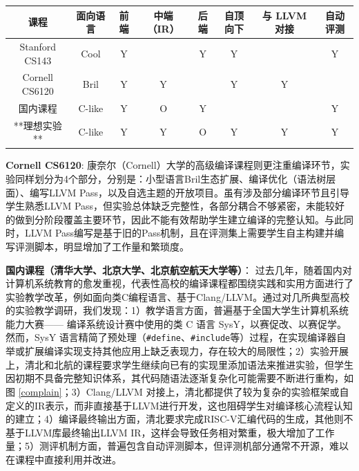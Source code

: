 \documentclass{SCIS2020cn}
\begin{document}
\begin{table}
    \label{tab_courses}
    \centering
    \footnotesize
    \tabcolsep 9pt %
    \begin{tabular*}{0.92\textwidth}{cccccccc}
        \toprule
        课程 & 面向语言 & 前端 & 中端（IR）& 后端 & 自顶向下 & 与 LLVM 对接 & 自动评测 \\\hline
        Stanford CS143\cite{stanford_cs143} & Cool & Y &  & Y & Y &  & Y \\
        Cornell CS6120\cite{cornell_cs1620} & Bril & Y & Y & & Y & Y  & \\
        国内课程\cite{thu21_compiler,pku20_compiler, buaa19_compiler} & C-like & Y & O & Y & &  & Y \\
        **理想实验** & C-like & Y & Y & O & Y & Y & Y \\
        \bottomrule
    \end{tabular*}
\end{table}

\textbf{Cornell CS6120}: 康奈尔（Cornell）大学的高级编译课程则更注重编译环节，实验同样划分为4个部分，分别是：小型语言Bril生态扩展、编译优化（语法树层面）、编写LLVM Pass，以及自选主题的开放项目。虽有涉及部分编译环节且引导学生熟悉LLVM Pass，但实验总体缺乏完整性，各部分耦合不够紧密，未能较好的做到分阶段覆盖主要环节，因此不能有效帮助学生建立编译的完整认知。与此同时，LLVM Pass编写是基于旧的Pass机制\cite{llvm_newpass}，且在评测集上需要学生自主构建并编写评测脚本，明显增加了工作量和繁琐度。

\textbf{国内课程（清华大学、北京大学、北京航空航天大学等）}：
过去几年，随着国内对计算机系统教育的愈发重视，代表性高校的编译课程都围绕实践和实用方面进行了实验教学改革，例如面向类C编程语言、基于Clang/LLVM。通过对几所典型高校的实验教学调研，我们发现：1）教学语言方面，普遍基于全国大学生计算机系统能力大赛—— 编译系统设计赛中使用的类 C 语言 SysY\cite{sysy}，以赛促改、以赛促学。然而，SysY 语言精简了预处理（\texttt{\#define}、\texttt{\#include}等）过程，在实现编译器自举或扩展编译实现支持其他应用上缺乏表现力，存在较大的局限性；2）实验开展上，清北和北航的课程要求学生继续向已有的实现里添加语法来推进实验，但学生因初期不具备完整知识体系，其代码随语法逐渐复杂化可能需要不断进行重构，如图 \ref{complain}；3）Clang/LLVM 对接上，清北都提供了较为复杂的实验框架或自定义的IR表示，而非直接基于LLVM进行开发，这也阻碍学生对编译核心流程认知的建立；4）编译最终输出方面，清北要求完成RISC-V汇编代码的生成，其他则不基于LLVM库最终输出LLVM IR，这样会导致任务相对繁重，极大增加了工作量；5）测评机制方面，普遍包含自动评测脚本，但评测机部分通常不开源，难以在课程中直接利用并改进。
\end{document}
